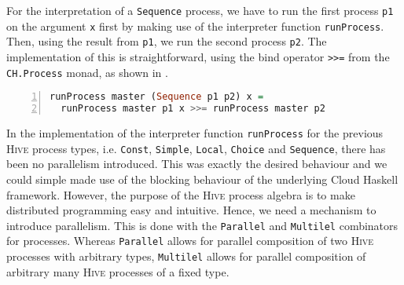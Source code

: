 For the interpretation of a \texttt{Sequence} process, we have to run the first process \texttt{p1} on the argument \texttt{x} first by making use of the interpreter function \texttt{runProcess}. Then, using the result from \texttt{p1}, we run the second process \texttt{p2}. The implementation of this is straightforward, using the bind operator \texttt{>}\texttt{>=} from the \texttt{CH.Process} monad, as shown in .
\begin{lstlisting}[language=Haskell,caption=Implementation of the interpreter for \texttt{Sequence} processes.,label=lst:runprocess_sequence,numbers=left,frame=bt]
runProcess master (Sequence p1 p2) x =
  runProcess master p1 x >>= runProcess master p2
\end{lstlisting}

In the implementation of the interpreter function \texttt{runProcess} for the previous \textsc{Hive} process types, i.e. \texttt{Const}, \texttt{Simple}, \texttt{Local}, \texttt{Choice} and \texttt{Sequence}, there has been no parallelism introduced. This was exactly the desired behaviour and we could simple made use of the blocking behaviour of the underlying \textsf{Cloud Haskell} framework. However, the purpose of the \textsc{Hive} process algebra is to make distributed programming easy and intuitive. Hence, we need a mechanism to introduce parallelism. This is done with the \texttt{Parallel} and \texttt{Multilel} combinators for processes. Whereas \texttt{Parallel} allows for parallel composition of two \textsc{Hive} processes with arbitrary types, \texttt{Multilel} allows for parallel composition of arbitrary many \textsc{Hive} processes of a fixed type.

